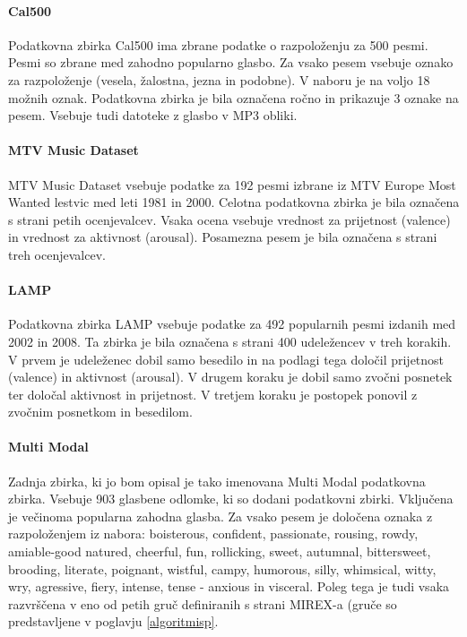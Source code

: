 \documentclass[a4paper, 12pt]{book}
\begin{document}
{\paragraph{Cal500}

Podatkovna zbirka Cal500 \cite{turnbull2008semantic} ima zbrane podatke o razpoloženju za 500 pesmi. Pesmi so zbrane med zahodno popularno glasbo. Za vsako pesem vsebuje oznako za razpoloženje (vesela, žalostna, jezna in podobne). V naboru je na voljo 18 možnih oznak. Podatkovna zbirka je bila označena ročno in prikazuje 3 oznake na pesem. Vsebuje tudi datoteke z glasbo v MP3 obliki.

\paragraph{MTV Music Dataset}

MTV Music Dataset \cite{schuller2010mister} vsebuje podatke za 192 pesmi izbrane iz MTV Europe Most Wanted lestvic med leti 1981 in 2000. Celotna podatkovna zbirka je bila označena s strani petih ocenjevalcev. Vsaka ocena vsebuje vrednost za prijetnost (valence) in vrednost za aktivnost (arousal). Posamezna pesem je bila označena s strani treh ocenjevalcev.

\paragraph{LAMP}

Podatkovna zbirka LAMP \cite{chu2010lamp} vsebuje podatke za 492 popularnih pesmi izdanih med 2002 in 2008. Ta zbirka je bila označena s strani 400 udeležencev v treh korakih. V prvem je udeleženec dobil samo besedilo in  na podlagi tega določil prijetnost (valence) in aktivnost (arousal). V drugem koraku je dobil samo zvočni posnetek ter določal aktivnost in prijetnost. V tretjem koraku je postopek ponovil z zvočnim posnetkom in besedilom.

\paragraph{Multi Modal}

Zadnja zbirka, ki jo bom opisal je tako imenovana Multi Modal \cite{panda2013multi} podatkovna zbirka. Vsebuje 903 glasbene odlomke, ki so dodani podatkovni zbirki. Vključena je večinoma popularna zahodna glasba. Za vsako pesem je določena oznaka z razpoloženjem iz nabora: boisterous, confident, passionate, rousing, rowdy, amiable-good natured, cheerful, fun, rollicking, sweet, autumnal, bittersweet, brooding, literate, poignant, wistful, campy, humorous, silly, whimsical, witty, wry, agressive, fiery, intense, tense - anxious in visceral. Poleg tega je tudi vsaka razvrščena v eno od petih gruč definiranih s strani MIREX-a (gruče so predstavljene v poglavju \ref{algoritmisp}. 

}
\end{document}
